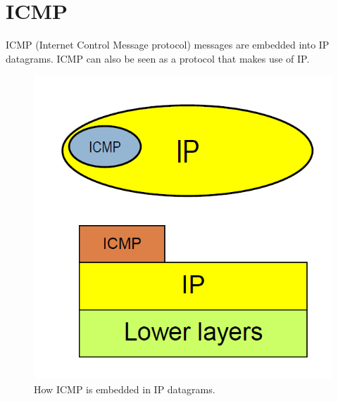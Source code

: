 \chapter{ICMP}
ICMP (Internet Control Message protocol) messages are embedded into IP datagrams.
ICMP can also be seen as a protocol that makes use of IP.
\begin{figure}[H]
\centering
\includegraphics[scale=0.35, angle=0]{./Images/ICMP/ICMP_embedding}
\caption{\footnotesize{How ICMP is embedded in IP datagrams.}}
\end{figure}

